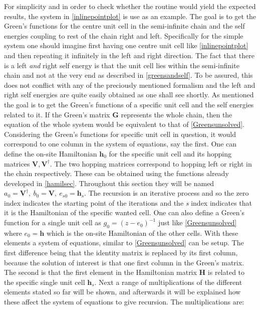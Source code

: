 For simplicity and in order to check whether the routine would yield the expected results, the system in \cref{inlinepointplot} is use as an example. The goal is to get the Green's functions for the centre unit cell in the semi-infinite chain and the self energies coupling to rest of the chain right and left. Specifically for the simple system one should imagine first having one centre unit cell like \cref{inlinepointplot} and then repeating it infinitely in the left and right direction. The fact that there is a left \textit{and} right self energy is that the unit cell lies within the semi-infinite chain and not at the very end as described in \cref{greensandself}. To be assured, this does not conflict with any of the preciously mentioned formalism and the left and right self energies are quite easily obtained as one shall see shortly. As mentioned the goal is to get the Green's functions of a specific unit cell and the self energies related to it. If the Green's matrix \(\mathbf{G}\) represents the whole chain, then the equation of the whole system would be equivalent to that of \cref{Greensunsolved}. Considering the Green's functions for specific unit cell in question, it would correspond to one column in the system of equations, say the first. One can define the on-site Hamiltonian \(\mathbf{h}_0\) for the specific unit cell and its hopping matrices \(\mathbf{V},\mathbf{V}^{\dagger}\).  The two hopping matrices correspond to hopping left or right in the chain respectively. These can be obtained using the functions already developed in \cref{hamilsec}. Throughout this section they will be named \(a_0 = \mathbf{V}^{\dagger}, \ b_0 = \mathbf{V}, \ e_{s0} = \mathbf{h}_{s}\). The recursion is an iterative process and so the zero index indicates the starting point of the iterations and the \textit{s} index indicates that it is the Hamiltonian of the specific wanted cell. One can also define a Green's function for a single unit cell as \(g_0 = (z-e_{0})^{-1}\) just like \cref{Greensunsolved} where \(e_{0}=\mathbf{h}\) which is the on-site Hamiltonian of the other cells. With these elements a system of equations, similar to \cref{Greensunsolved} can be setup. The first difference being that the identity matrix is replaced by its first column, because the solution of interest is that one first column in the Green's matrix. The second is that the first element in the Hamiltonian matrix \(\mathbf{H}\) is related to the specific single unit cell \(\mathbf{h}_s\). Next a range of multiplications of the different elements stated so far will be shown, and afterwards it will be explained how these affect the system of equations to give recursion. The multiplications are:
